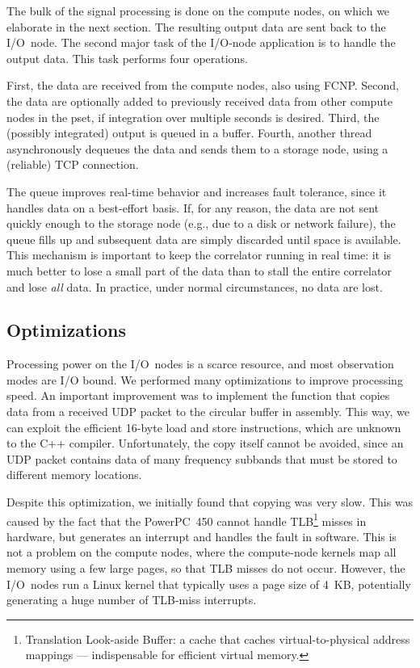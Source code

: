\documentclass{sig-alternate}
\begin{document}
The bulk of the signal processing is done on the compute nodes, on which we
elaborate in the next section.
The resulting output data are sent back to the I/O~node.
The second major task of the I/O-node application is to handle the output data.
This task performs four operations.

First, the data are received from the compute nodes, also using FCNP.
Second, the data are optionally added to previously received data from other
compute nodes in the pset, if integration over multiple seconds is desired.
Third, the (possibly integrated) output is queued in a buffer.
Fourth, another thread asynchronously dequeues the data and sends them to
a storage node, using a (reliable) TCP connection.

The queue improves real-time behavior and increases fault tolerance, since
it handles data on a best-effort basis.
If, for any reason, the data are not sent quickly enough to the storage node
(e.g., due to a disk or network failure), the queue fills up and subsequent
data are simply discarded until space is available.
This mechanism is important to keep the correlator running in real
time: it is much better to lose a small part of the data than to stall the
entire correlator and lose \emph{all\/} data.
In practice, under normal circumstances, no data are lost.


\subsection{Optimizations}

Processing power on the I/O~nodes is a scarce resource, and most observation
modes are I/O bound.
We performed many optimizations to improve processing speed.
An important improvement was to implement the function that copies data from a
received UDP packet to the circular buffer in assembly.
This way, we can exploit the efficient 16-byte load and
store instructions, which are unknown to the C++ compiler.
Unfortunately, the copy itself cannot be avoided, since an UDP packet contains
data of many frequency subbands that must be stored to different memory
locations.

Despite this optimization, we initially found that copying was very slow.
This was caused by the fact that the PowerPC~450 cannot handle
TLB\footnote{Translation Look-aside Buffer: a cache that caches
virtual-to-physical address mappings --- indispensable for efficient virtual
memory.} misses in hardware, but generates an interrupt and handles the fault
in software.
This is not a problem on the compute nodes, where the compute-node kernels 
map all memory using a few large pages, so that TLB misses do not occur.
However, the I/O~nodes run a Linux kernel that typically uses a page size of
4~KB, potentially generating a huge number of TLB-miss interrupts.
\end{document}
